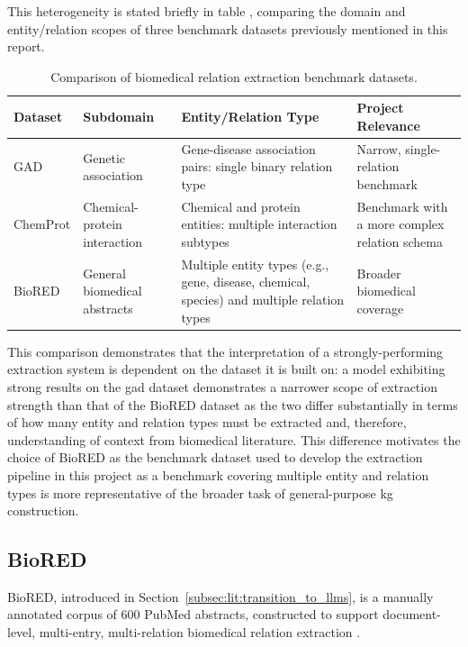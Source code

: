 This heterogeneity is stated briefly in table \pref, comparing the domain and entity/relation scopes of three benchmark datasets previously mentioned in this report.

\begin{table}[H]
    \centering
    \caption{Comparison of biomedical relation extraction benchmark datasets.}
    \label{tab:re-performance}
    \begin{tabularx}{\textwidth}{l Y Y Y}
        \toprule
        Dataset & Subdomain & Entity/Relation Type & Project Relevance \\
        \midrule
        GAD \cite{bravo2015extraction}
        & Genetic association
        & Gene-disease association pairs: single binary relation type
        & Narrow, single-relation benchmark \\
        ChemProt \cite{krallinger2017overview}
        & Chemical-protein interaction
        & Chemical and protein entities: multiple interaction subtypes
        & Benchmark with a more complex relation schema \\
        BioRED \cite{luo2022_biored}
        & General biomedical abstracts
        & Multiple entity types (e.g., gene, disease, chemical, species) and multiple relation types
        & Broader biomedical coverage \\
        \bottomrule
    \end{tabularx}
\end{table}

This comparison demonstrates that the interpretation of a strongly-performing extraction system is dependent on the dataset it is built on: a model exhibiting strong results on the \gls{gad} dataset demonstrates a narrower scope of extraction strength than that of the BioRED dataset as the two differ substantially in terms of how many entity and relation types must be extracted and, therefore, understanding of context from biomedical literature. This difference motivates the choice of BioRED as the benchmark dataset used to develop the extraction pipeline in this project as a benchmark covering multiple entity and relation types is more representative of the broader task of general-purpose \gls{kg} construction.

\subsection{BioRED}
\label{subsec:lit:biored}
BioRED, introduced in Section~\ref{subsec:lit:transition_to_llms}, is a manually annotated corpus of 600 PubMed abstracts, constructed to support document-level, multi-entry, multi-relation biomedical relation extraction \pref. %

